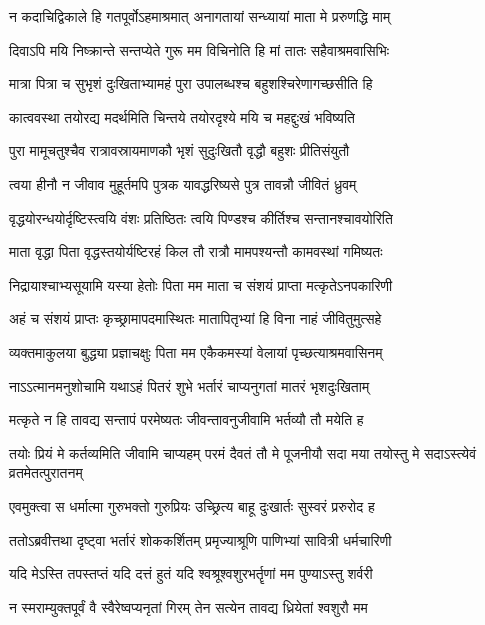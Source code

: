 \begin{center}
\twolineshloka
{न कदाचिद्विकाले हि गतपूर्वोऽहमाश्रमात्}
{अनागतायां सन्ध्यायां माता मे प्ररुणद्धि माम्}


\twolineshloka
{दिवाऽपि मयि निष्क्रान्ते सन्तप्येते गुरू मम}
{विचिनोति हि मां तातः सहैवाश्रमवासिभिः}


\twolineshloka
{मात्रा पित्रा च सुभृशं दुःखिताभ्यामहं पुरा}
{उपालब्धश्च बहुशश्चिरेणागच्छसीति हि}


\twolineshloka
{कात्ववस्था तयोरद्य मदर्थमिति चिन्तये}
{तयोरदृश्ये मयि च महद्दुःखं भविष्यति}


\twolineshloka
{पुरा मामूचतुश्चैव रात्रावस्रायमाणकौ}
{भृशं सुदुःखितौ वृद्धौ बहुशः प्रीतिसंयुतौ}


\twolineshloka
{त्वया हीनौ न जीवाव मुहूर्तमपि पुत्रक}
{यावद्धरिष्यसे पुत्र तावन्नौ जीवितं ध्रुवम्}


\twolineshloka
{वृद्धयोरन्धयोर्दृष्टिस्त्वयि वंशः प्रतिष्ठितः}
{त्वयि पिण्डश्च कीर्तिश्च सन्तानश्चावयोरिति}


\twolineshloka
{माता वृद्धा पिता वृद्धस्तयोर्यष्टिरहं किल}
{तौ रात्रौ मामपश्यन्तौ कामवस्थां गमिष्यतः}


\twolineshloka
{निद्रायाश्चाभ्यसूयामि यस्या हेतोः पिता मम}
{माता च संशयं प्राप्ता मत्कृतेऽनपकारिणी}


\twolineshloka
{अहं च संशयं प्राप्तः कृच्छ्रामापदमास्थितः}
{मातापितृभ्यां हि विना नाहं जीवितुमुत्सहे}


\twolineshloka
{व्यक्तमाकुलया बुद्ध्या प्रज्ञाचक्षुः पिता मम}
{एकैकमस्यां वेलायां पृच्छत्याश्रमवासिनम्}


\twolineshloka
{नाऽऽत्मानमनुशोचामि यथाऽहं पितरं शुभे}
{भर्तारं चाप्यनुगतां मातरं भृशदुःखिताम्}


\twolineshloka
{मत्कृते न हि तावद्य सन्तापं परमेष्यतः}
{जीवन्तावनुजीवामि भर्तव्यौ तौ मयेति ह}


\threelineshloka
{तयोः प्रियं मे कर्तव्यमिति जीवामि चाप्यहम्}
{परमं दैवतं तौ मे पूजनीयौ सदा मया}
{तयोस्तु मे सदाऽस्त्येवं  व्रतमेतत्पुरातनम्}




\twolineshloka
{एवमुक्त्वा स धर्मात्मा गुरुभक्तो गुरुप्रियः}
{उच्छ्रित्य बाहू दुःखार्तः सुस्वरं प्ररुरोद ह}


\twolineshloka
{ततोऽब्रवीत्तथा दृष्ट्वा भर्तारं शोककर्शितम्}
{प्रमृज्याश्रूणि पाणिभ्यां सावित्री धर्मचारिणी}


\twolineshloka
{यदि मेऽस्ति तपस्तप्तं यदि दत्तं हुतं यदि}
{श्वश्रूश्वशुरभर्तॄणां मम पुण्याऽस्तु शर्वरी}


\twolineshloka
{न स्मराम्युक्तपूर्वं वै स्वैरेष्वप्यनृतां गिरम्}
{तेन सत्येन तावद्य ध्रियेतां श्वशुरौ मम}


\end{center}

